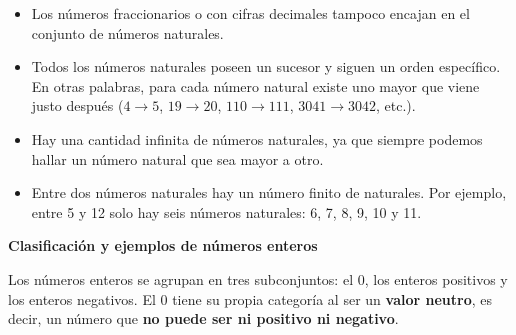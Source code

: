 \begin{center}
\begin{minipage}{0.8\linewidth}
			\begin{itemize}
				\item Los números fraccionarios o con cifras decimales tampoco encajan en el conjunto de números naturales.
				\item Todos los números naturales poseen un sucesor y siguen un orden específico. En otras palabras, para cada número natural existe uno mayor que viene justo después ($4\to5$, $19\to20$, $110\to111$, $3041\to3042$, etc.).
				\item Hay una cantidad infinita de números naturales, ya que siempre podemos hallar un número natural que sea mayor a otro.
				\item Entre dos números naturales hay un número finito de naturales. Por ejemplo, entre 5 y 12 solo hay seis números naturales: 6, 7, 8, 9, 10 y 11.
			\end{itemize}
		\end{minipage}
		
		\bigskip
		
		\begin{minipage}{0.8\linewidth}
		\begin{center}
			\bfseries
			Clasificación y ejemplos de números enteros
		\end{center}
		
		Los números enteros se agrupan en tres subconjuntos: el 0, los enteros positivos y los enteros negativos. El 0 tiene su propia categoría al ser un \textbf{valor neutro}, es decir, un número que \textbf{no puede ser ni positivo ni negativo}.
		

\end{minipage}
\end{center}
